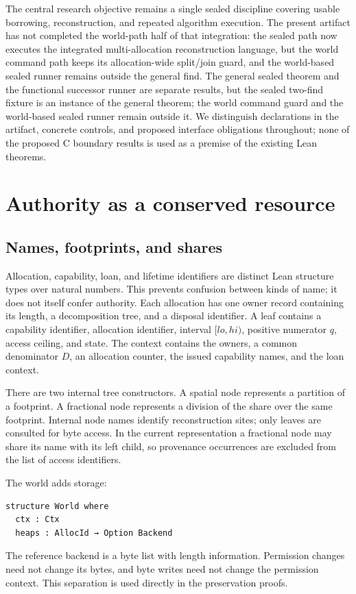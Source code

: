 \documentclass[a4paper,UKenglish,cleveref]{lipics-v2021}
\begin{document}
The central research objective remains a single sealed discipline covering
usable borrowing, reconstruction, and repeated algorithm execution. The present
artifact has not completed the world-path half of that integration: the sealed
path now executes the integrated multi-allocation reconstruction language, but
the world command path keeps its allocation-wide split/join guard, and the
world-based sealed runner remains outside the general find. The
general sealed theorem and the functional successor runner are separate
results, but the sealed two-find fixture is an instance of the general theorem;
the world command guard and the world-based sealed runner remain outside it. We
distinguish
declarations in the artifact, concrete controls, and proposed interface
obligations throughout; none of the proposed C boundary results is used as a
premise of the existing Lean theorems.

\section{Authority as a conserved resource}
\label{sec:ledger}

\subsection{Names, footprints, and shares}

Allocation, capability, loan, and lifetime identifiers are distinct Lean
structure types over natural numbers. This prevents confusion between kinds of
name; it does not itself confer authority. Each allocation has one owner record
containing its length, a decomposition tree, and a disposal identifier. A leaf
contains a capability identifier, allocation identifier, interval $[lo,hi)$,
positive numerator $q$, access ceiling, and state. The context contains the
owners, a common denominator $D$, an allocation counter, the issued capability
names, and the loan context.

There are two internal tree constructors. A spatial node represents a partition
of a footprint. A fractional node represents a division of the share over the
same footprint. Internal node names identify reconstruction sites; only leaves
are consulted for byte access. In the current representation a fractional node
may share its name with its left child, so provenance occurrences are excluded
from the list of access identifiers.

The world adds storage:
\begin{lstlisting}
structure World where
  ctx : Ctx
  heaps : AllocId → Option Backend
\end{lstlisting}
The reference backend is a byte list with length information. Permission changes
need not change its bytes, and byte writes need not change the permission
context. This separation is used directly in the preservation proofs.
\end{document}
